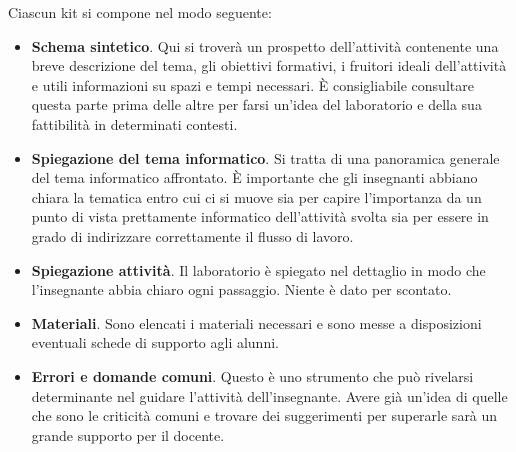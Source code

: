 \documentclass[12pt]{article}
\begin{document}
Ciascun kit si compone nel modo seguente:
\begin{itemize}
\item
\textbf{Schema sintetico}. Qui si troverà un prospetto dell'attività contenente una breve descrizione del tema, gli obiettivi formativi, i fruitori ideali dell'attività e utili informazioni su spazi e tempi necessari. È consigliabile consultare questa parte prima delle altre per farsi un'idea del laboratorio e della sua fattibilità in determinati contesti.
\item
\textbf{Spiegazione del tema informatico}. Si tratta di una panoramica generale del tema informatico affrontato. È importante che gli insegnanti abbiano chiara la tematica entro cui ci si muove sia per capire l'importanza da un punto di vista prettamente informatico dell'attività svolta sia per essere in grado di indirizzare correttamente il flusso di lavoro.
\item
\textbf{Spiegazione attività}. Il laboratorio è spiegato nel dettaglio in modo che l'insegnante abbia chiaro ogni passaggio. Niente è dato per scontato.
\item
\textbf{Materiali}. Sono elencati i materiali necessari e sono messe a disposizioni eventuali schede di supporto agli alunni.
\item
\textbf{Errori e domande comuni}. Questo è uno strumento che può rivelarsi determinante nel guidare l'attività dell'insegnante. Avere già un'idea di quelle che sono le criticità comuni e trovare dei suggerimenti per superarle sarà un grande supporto per il docente.
\end{itemize}
%
%
\end{document}
